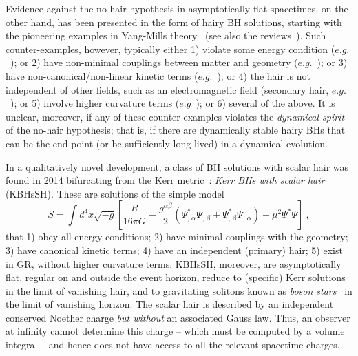 \documentclass{article}
\numberwithin{equation}{section}
\begin{document}
Evidence against the no-hair hypothesis in asymptotically flat spacetimes, on the other hand, has been presented in the form of hairy BH solutions, starting with the pioneering examples in Yang-Mills theory~\cite{Volkov:1998cc} (see also the reviews~\cite{Bizon:1994dh,Bekenstein:1996pn,Herdeiro:2015waa,Volkov:2016ehx}). 
Such counter-examples, however, typically either 
1) violate some energy condition ($e.g.$~\cite{Nucamendi:1995ex,Bechmann:1995sa,Anabalon:2013qua,Anabalon:2012ih,Cadoni:2015gfa}); or 
2) have non-minimal couplings between matter and geometry ($e.g.$~\cite{Bekenstein:1975ts,Bekenstein:1974sf,BBM,Sotiriou:2014pfa,Sotiriou:2013qea,Babichev:2013cya}); or 
3) have non-canonical/non-linear kinetic terms ($e.g.$~\cite{Luckock:1986tr,Luckock,Bronnikov:2005gm,Radu:2011uj}); or 
4) the hair is not independent of other fields, such as an electromagnetic field (secondary hair, $e.g.$~\cite{Gibbons:1987ps,Gibbons:1982ih}); or 
5) involve higher curvature terms 
($e.g$~\cite{Kanti:1995vq,Ayzenberg:2014aka,Kleihaus:2011tg,Kleihaus:2015aje,Pani:2011gy,Pani:2009wy,Alexander:2009tp,Yunes:2009hc}); or 
6) several of the above. It is unclear, moreover, if any of these counter-examples violates the \textit{dynamical spirit} of the no-hair hypothesis; that is, if there are dynamically stable hairy BHs that can be the end-point (or be sufficiently long lived) in a dynamical evolution.

\bigskip

In a qualitatively novel development, a class of BH solutions with scalar hair was found in 2014 bifurcating from the Kerr metric~\cite{Herdeiro:2014goa}: \textit{Kerr BHs with scalar hair} (KBHsSH).
%
 These are solutions of the simple model
 \begin{equation}
\label{actionscalar}
S=\int  d^4x \sqrt{-g}\left[ \frac{R}{16\pi G}
   -\frac{g^{\alpha\beta}}{2} \left( \Psi_{, \, \alpha}^* \Psi_{, \, \beta} + \Psi _
{, \, \beta}^* \Psi _{, \, \alpha} \right) - \mu^2 \Psi^*\Psi
 \right]  \ ,
\end{equation}
that 1) obey all energy conditions; 2) have minimal couplings with the geometry; 3) have canonical kinetic terms; 4) have an independent (primary) hair; 5) exist in GR, without higher curvature terms. KBHsSH, moreover, are asymptotically flat, regular on and outside the event horizon, reduce to (specific) Kerr solutions in the limit of vanishing hair, and to gravitating solitons known as \textit{boson stars}~\cite{Schunck:2003kk,Liebling:2012fv} in the limit of vanishing horizon. The scalar hair is described by an independent  conserved Noether charge \textit{but without} an associated Gauss law. Thus, an observer at infinity cannot determine this charge -- which must be computed by a volume integral -- and hence does not have access to all the relevant spacetime charges.  
\end{document}
